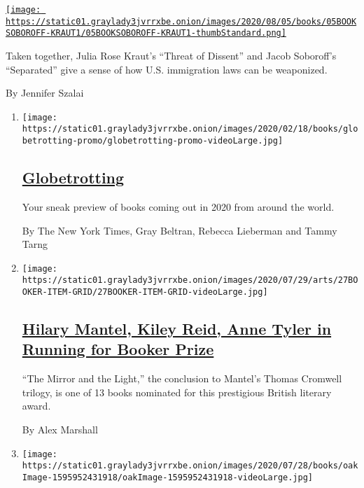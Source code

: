 \begin{enumerate}
\begin{enumerate}
    \href{/2020/07/30/books/review-threat-dissent-julia-rose-kraut-separated-jacob-soboroff.html}{\texttt{[image: https://static01.graylady3jvrrxbe.onion/images/2020/08/05/books/05BOOKSOBOROFF-KRAUT1/05BOOKSOBOROFF-KRAUT1-thumbStandard.png]}}

    Taken together, Julia Rose Kraut's ``Threat of Dissent'' and Jacob
    Soboroff's ``Separated'' give a sense of how U.S. immigration laws
    can be weaponized.

    By Jennifer Szalai
  \end{enumerate}
\end{enumerate}

\begin{enumerate}
\def\labelenumi{\arabic{enumi}.}
\item
  \texttt{[image: https://static01.graylady3jvrrxbe.onion/images/2020/02/18/books/globetrotting-promo/globetrotting-promo-videoLarge.jpg]}

  \hypertarget{globetrotting}{%
  \subsection{\texorpdfstring{\href{/interactive/2020/01/08/books/new-books-international.html}{Globetrotting}}{Globetrotting}}\label{globetrotting}}

  Your sneak preview of books coming out in 2020 from around the world.

  By The New York Times, Gray Beltran, Rebecca Lieberman and Tammy Tarng
\item
  \texttt{[image: https://static01.graylady3jvrrxbe.onion/images/2020/07/29/arts/27BOOKER-ITEM-GRID/27BOOKER-ITEM-GRID-videoLarge.jpg]}

  \hypertarget{hilary-mantel-kiley-reid-anne-tyler-in-running-for-booker-prize}{%
  \subsection{\texorpdfstring{\href{/2020/07/27/books/hilary-mantel-booker-prize-longlist.html}{Hilary
  Mantel, Kiley Reid, Anne Tyler in Running for Booker
  Prize}}{Hilary Mantel, Kiley Reid, Anne Tyler in Running for Booker Prize}}\label{hilary-mantel-kiley-reid-anne-tyler-in-running-for-booker-prize}}

  ``The Mirror and the Light,'' the conclusion to Mantel's Thomas
  Cromwell trilogy, is one of 13 books nominated for this prestigious
  British literary award.

  By Alex Marshall
\item
  \texttt{[image: https://static01.graylady3jvrrxbe.onion/images/2020/07/28/books/oakImage-1595952431918/oakImage-1595952431918-videoLarge.jpg]}


\end{enumerate}
